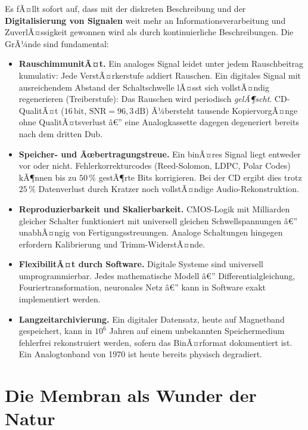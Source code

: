 ﻿\documentclass[12pt,a4paper,titlepage]{report}
\begin{document}
Es fÃ¤llt sofort auf, dass mit der diskreten Beschreibung und der
\textbf{Digitalisierung von Signalen} weit mehr an Informationsverarbeitung
und ZuverlÃ¤ssigkeit gewonnen wird als durch kontinuierliche Beschreibungen.
Die GrÃ¼nde sind fundamental:

\begin{itemize}[leftmargin=2em]
	\item \textbf{RauschimmunitÃ¤t.}
		Ein analoges Signal leidet unter jedem Rauschbeitrag kumulativ:
		Jede VerstÃ¤rkerstufe addiert Rauschen.
		Ein digitales Signal mit ausreichendem Abstand der Schaltschwelle
		lÃ¤sst sich vollstÃ¤ndig regenerieren (Treiberstufe):
		Das Rauschen wird periodisch \emph{gelÃ¶scht}.
		CD-QualitÃ¤t ($16\,\mathrm{bit}$, $\mathrm{SNR}=96{,}3\,\mathrm{dB}$)
		Ã¼bersteht tausende KopiervorgÃ¤nge ohne QualitÃ¤tsverlust â€”
		eine Analogkassette dagegen degeneriert bereits nach dem dritten Dub.
	\item \textbf{Speicher- und Ãœbertragungstreue.}
		Ein binÃ¤res Signal liegt entweder vor oder nicht.
		Fehlerkorrekturcodes (Reed-Solomon, LDPC, Polar Codes)
		kÃ¶nnen bis zu $50\,\%$ gestÃ¶rte Bits korrigieren.
		Bei der CD ergibt dies trotz $25\,\%$ Datenverlust durch
		Kratzer noch vollstÃ¤ndige Audio-Rekonstruktion.
	\item \textbf{Reproduzierbarkeit und Skalierbarkeit.}
		CMOS-Logik mit Milliarden gleicher Schalter funktioniert mit
		universell gleichen Schwellspannungen â€” unabhÃ¤ngig von
		Fertigungsstreuungen.
		Analoge Schaltungen hingegen erfordern Kalibrierung
		und Trimm-WiderstÃ¤nde.
	\item \textbf{FlexibilitÃ¤t durch Software.}
		Digitale Systeme sind universell umprogrammierbar.
		Jedes mathematische Modell â€” Differential\-gleichung,
		Fouriertransformation, neuronales Netz â€” kann in Software
		exakt implementiert werden.
	\item \textbf{Langzeitarchivierung.}
		Ein digitaler Datensatz, heute auf Magnetband gespeichert,
		kann in $10^6$ Jahren auf einem unbekannten Speichermedium
		fehlerfrei rekonstruiert werden, sofern das BinÃ¤rformat
		dokumentiert ist.
		Ein Analogtonband von 1970 ist heute bereits physisch degradiert.
\end{itemize}

\section{Die Membran als Wunder der Natur}
\end{document}
